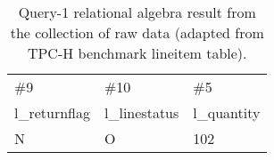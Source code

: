 
\begin{table}[H]
\caption{Query-1 relational algebra result from the collection of raw data (adapted from TPC-H benchmark lineitem table). }
\label{table:results_query_1}
\scriptsize
\centering
\begin{tabular}{ |  L{1.5cm} |  L{1.5cm}  |  L{1.5cm}  |    } 
\hline
\#9	&	\#10		 & \#5	  \\ 
l\_returnflag	&	l\_linestatus	&	 l\_quantity 	  \\ \hline
\hline
N	&	O	&	102	  \\ \hline
\end{tabular}
\end{table}
